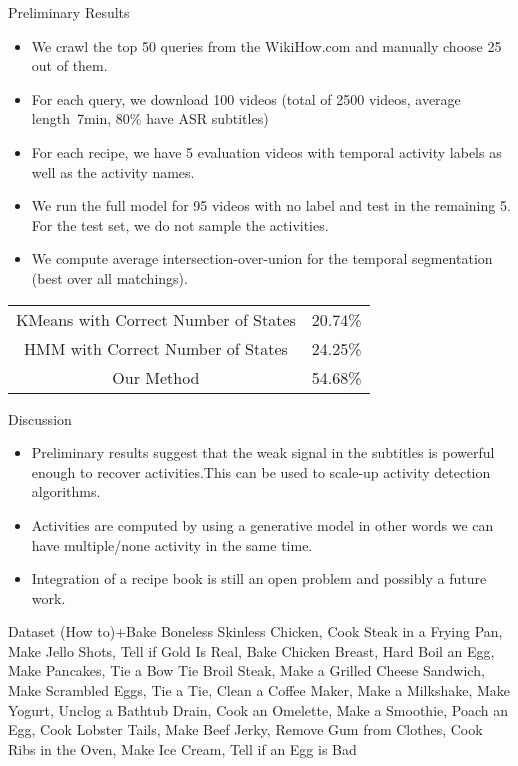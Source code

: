 \begin{frame}{Preliminary Results}
\begin{itemize}
  \item We crawl the top 50 queries from the WikiHow.com and manually choose 25 out of them.
  \item For each query, we download 100 videos (total of 2500 videos, average length~7min, 80\% have ASR subtitles)
  \item For each recipe, we have 5 evaluation videos with temporal activity labels as well as the activity names.
  \item We run the full model for 95 videos with no label and test in the remaining 5. For the test set, we do not sample the activities.
  \item We compute average intersection-over-union for the temporal segmentation (best over all matchings).
\end{itemize}
\begin{center}
\begin{tabular}{cc}
  KMeans with Correct Number of States & 20.74\% \\
  HMM with Correct Number of States & 24.25\% \\
  Our Method & 54.68\%
\end{tabular}
\end{center}
\end{frame}

\begin{frame}{Discussion}
  \begin{itemize}
    \item Preliminary results suggest that the weak signal in the subtitles is powerful enough to recover activities.This can be used to scale-up activity detection algorithms.
    \item Activities are computed by using a generative model in other words we can have multiple/none activity in the same time.
    \item Integration of a recipe book is still an open problem and possibly a future work.
  \end{itemize}
\end{frame}

\begin{frame}{Dataset}
(How to)+Bake Boneless Skinless Chicken, Cook Steak in a Frying Pan, Make Jello Shots, Tell if Gold Is Real, Bake Chicken Breast, Hard Boil an Egg, Make Pancakes, Tie a Bow Tie
Broil Steak, Make a Grilled Cheese Sandwich, Make Scrambled Eggs, Tie a Tie, Clean a Coffee Maker, Make a Milkshake, Make Yogurt, Unclog a Bathtub Drain, Cook an Omelette,
Make a Smoothie, Poach an Egg, Cook Lobster Tails, Make Beef Jerky, Remove Gum from Clothes, Cook Ribs in the Oven, Make Ice Cream, Tell if an Egg is Bad
\end{frame}
